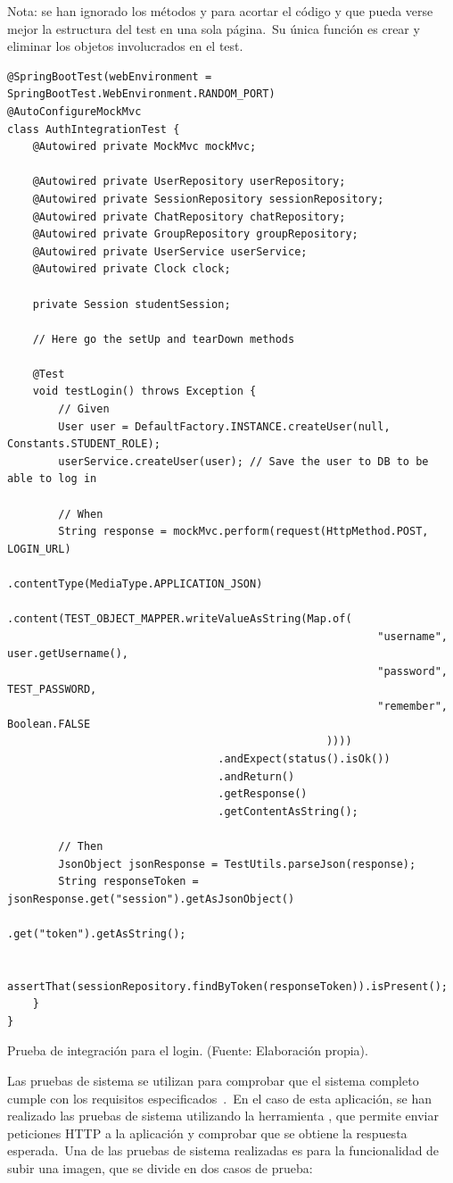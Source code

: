 	{\footnotesize Nota: se han ignorado los métodos  y  para acortar el código y
que pueda verse mejor la estructura del test en una sola página.\ Su única función es crear y eliminar los objetos
involucrados en el test.}
\begin{codeBlock}
	\begin{verbatim}
@SpringBootTest(webEnvironment = SpringBootTest.WebEnvironment.RANDOM_PORT)
@AutoConfigureMockMvc
class AuthIntegrationTest {
	@Autowired private MockMvc mockMvc;

	@Autowired private UserRepository userRepository;
	@Autowired private SessionRepository sessionRepository;
	@Autowired private ChatRepository chatRepository;
	@Autowired private GroupRepository groupRepository;
	@Autowired private UserService userService;
	@Autowired private Clock clock;

	private Session studentSession;

	// Here go the setUp and tearDown methods

	@Test
	void testLogin() throws Exception {
		// Given
		User user = DefaultFactory.INSTANCE.createUser(null, Constants.STUDENT_ROLE);
		userService.createUser(user); // Save the user to DB to be able to log in

		// When
		String response = mockMvc.perform(request(HttpMethod.POST, LOGIN_URL)
												  .contentType(MediaType.APPLICATION_JSON)
												  .content(TEST_OBJECT_MAPPER.writeValueAsString(Map.of(
														  "username", user.getUsername(),
														  "password", TEST_PASSWORD,
														  "remember", Boolean.FALSE
												  ))))
								 .andExpect(status().isOk())
								 .andReturn()
								 .getResponse()
								 .getContentAsString();

		// Then
		JsonObject jsonResponse = TestUtils.parseJson(response);
		String responseToken = jsonResponse.get("session").getAsJsonObject()
                                           .get("token").getAsString();

		assertThat(sessionRepository.findByToken(responseToken)).isPresent();
	}
}
	\end{verbatim}
	\caption{Prueba de integración para el login. (Fuente: Elaboración propia).}
	\label{code:pruebas-integracion-login}
\end{codeBlock}


Las pruebas de sistema se utilizan para comprobar que el sistema completo
cumple con los requisitos especificados~\cite{system_testing}.\ En el caso de esta aplicación, se han realizado
las pruebas de sistema
utilizando la herramienta , que permite enviar peticiones HTTP a la aplicación y comprobar que se
obtiene la respuesta esperada.\ Una de las pruebas de sistema realizadas es para la funcionalidad de
subir una imagen, que se divide en dos casos de prueba:

